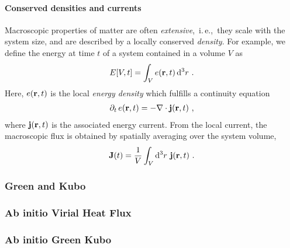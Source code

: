 \paragraph{Conserved densities and currents}
Macroscopic properties of matter are often \emph{extensive},~i.\,e.,~they scale with the system size, and are described by a locally conserved \emph{density}. For example, we define the energy at time $t$ of a system contained in a volume $V$ as
\begin{align}
  E [V, t] = \int_V e ({\bf r}, t) \, {\rm d}^3 r~.
  \label{eq:lr.E(V)}
\end{align}
Here, $e({\bf r}, t)$ is the local \emph{energy density} which fulfills a continuity equation
\begin{align}
  \partial_t \, e({\bf r}, t) = - {\bf \nabla} \cdot {\bf j} ({\bf r}, t)~,
  \label{eq:lr.continuity.1}
\end{align}
where ${\bf j} ({\bf r}, t)$ is the associated energy current. From the local current, the macroscopic flux is obtained by spatially averaging over the system volume,
\begin{align}
  {\bf J} (t)
    = \frac{1}{V} \int_V {\rm d}^3 r ~ {\bf j} ({\bf r}, t)~.
  \label{eq:lr.J(t)}
\end{align}


 



\subsubsection{Green and Kubo}
\subsubsection{Ab initio Virial Heat Flux}
\subsubsection{Ab initio Green Kubo}